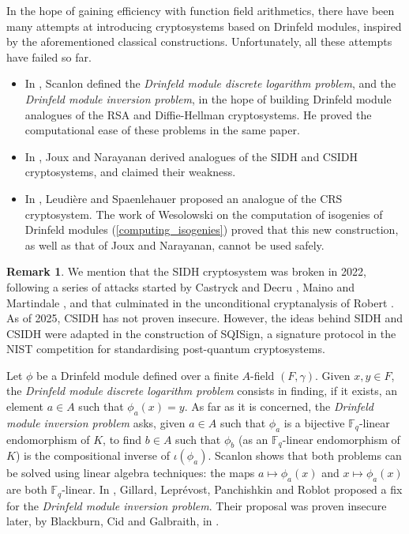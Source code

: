 \documentclass[11pt]{article}
\theoremstyle{definition}
\newtheorem{remark}[theorem]{Remark}
\newcommand\Fq{\mathbb{F}_q}
\begin{document}
In the hope of gaining efficiency with function field arithmetics, there have
been many attempts at introducing cryptosystems based on Drinfeld modules, inspired by the aforementioned classical constructions. Unfortunately, all these attempts have failed so far.

\begin{itemize}

  \item In \cite{scanlon_public_2001}, Scanlon defined the \emph{Drinfeld
    module discrete logarithm problem}, and the \emph{Drinfeld module inversion problem}, in the hope of building Drinfeld module analogues of the RSA and
    Diffie-Hellman cryptosystems. He proved the computational ease of these
    problems in the same paper.

  \item In \cite{joux_drinfeld_2019}, Joux and Narayanan derived analogues of
    the SIDH \cite{jao_towards_2011} and CSIDH \cite{castryck_csidh_2018}
    cryptosystems, and claimed their weakness.
  
  \item In \cite{leudiere_hard_2022}, Leudière and Spaenlehauer proposed an
    analogue of the CRS cryptosystem. The work of Wesolowski on the computation
    of isogenies of Drinfeld modules (\cref{computing_isogenies}) proved that this new construction, as well as that of Joux and Narayanan, cannot be
    used safely.
\end{itemize}

\begin{remark}
  We mention that the SIDH cryptosystem was broken in 2022, following a
  series of attacks started by Castryck and Decru \cite{castryck_efficient_2023},
  Maino and Martindale \cite{maino_attack_2022}, and that culminated in the
  unconditional cryptanalysis of Robert \cite{robert_breaking_2023}. As of 2025, CSIDH has not proven insecure. However, the ideas behind SIDH and
  CSIDH were adapted in the construction of SQISign, a signature protocol in the NIST competition for standardising post-quantum cryptosystems.
\end{remark}
%
Let $\phi$ be a Drinfeld module defined over a finite $A$-field $(F, \gamma)$.
Given $x,y \in F$, the \emph{Drinfeld module discrete logarithm problem}
consists in finding, if it exists, an element $a \in A$ such that $\phi_a(x) =
y$. As far as it is concerned, the \emph{Drinfeld module inversion problem}
asks, given $a \in A$ such that $\phi_a$ is a bijective $\Fq$-linear
endomorphism of $K$, to find $b \in A$ such that $\phi_b$ (as an $\Fq$-linear
endomorphism of $K$) is the compositional inverse of $\iota(\phi_a)$. Scanlon
shows that both problems can be solved using linear algebra techniques: the
maps $a \mapsto \phi_a(x)$ and $x \mapsto \phi_a(x)$ are both $\Fq$-linear. In
\cite{gillard_utilisation_2003}, Gillard, Leprévost, Panchishkin and Roblot
proposed a fix for the \emph{Drinfeld module inversion problem}. Their proposal was proven insecure later, by Blackburn, Cid and Galbraith, in
\cite{blackburn_cryptanalysis_2006}.
\end{document}

